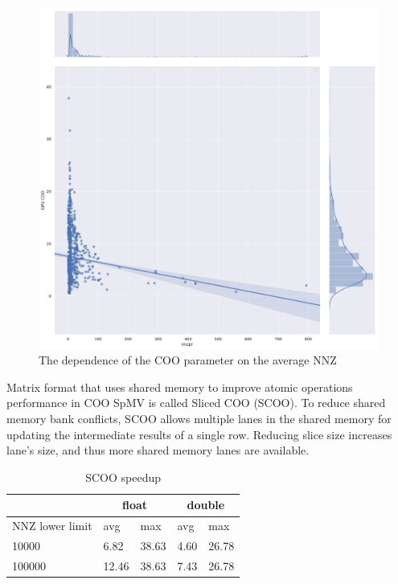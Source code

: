 \documentclass{article}
\begin{document}
\begin{figure}[H]
\centering
  \includegraphics[width=1.0\textwidth]{img/coo_nnzpr.pdf}
  \caption{The dependence of the COO parameter on the average NNZ}
  \label{coo_nnzpr}
\end{figure}

Matrix format that uses shared memory to improve atomic operations performance in COO SpMV is called Sliced COO (SCOO).
To reduce shared memory bank conflicts, SCOO allows multiple lanes in the shared memory for updating the intermediate results of a
single row. Reducing slice size increases lane's size, and thus more shared memory lanes are available.

\begin{table}[H]
	\centering
	\begin{tabular}{ |p{2.6cm}||p{1cm}|p{1cm}|p{1cm}|p{1cm}|  }
	 \hline
		& \multicolumn{2}{|c|}{float} & \multicolumn{2}{|c|}{double}\\
	 \hline
	 NNZ lower limit & avg & max & avg & max  \\
	 \hline
	 10000  & 6.82  & 38.63 & 4.60 & 26.78 \\
	 100000 & 12.46 & 38.63 & 7.43 & 26.78 \\
	 \hline
	\end{tabular}
	\caption{SCOO speedup}
  \label{scoo_speedup_table}
\end{table}
\end{document}
